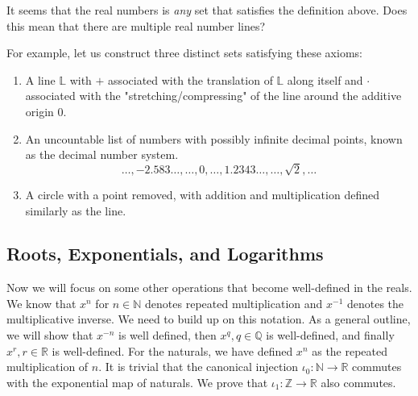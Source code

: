   It seems that the real numbers is \textit{any} set that satisfies the definition above. Does this mean that there are multiple real number lines? 

  \begin{example}
    For example, let us construct three distinct sets satisfying these axioms: 
    \begin{enumerate}
      \item A line $\mathbb{L}$ with $+$ associated with the translation of $\mathbb{L}$ along itself and $\cdot$ associated with the "stretching/compressing" of the line around the additive origin $0$. 
      \item An uncountable list of numbers with possibly infinite decimal points, known as the decimal number system. 
      \begin{equation}
        \ldots, -2.583\ldots, \ldots , 0, \ldots, 1.2343\ldots, \ldots, \sqrt{2}, \ldots
      \end{equation}
      \item A circle with a point removed, with addition and multiplication defined similarly as the line. 
    \end{enumerate}
  \end{example}

\subsection{Roots, Exponentials, and Logarithms} 

  Now we will focus on some other operations that become well-defined in the reals. We know that $x^{n}$ for $n \in \mathbb{N}$ denotes repeated multiplication and $x^{-1}$ denotes the multiplicative inverse. We need to build up on this notation. As a general outline, we will show that $x^{-n}$ is well defined, then $x^q, q \in \mathbb{Q}$ is well-defined, and finally $x^r, r \in \mathbb{R}$ is well-defined. For the naturals, we have defined $x^n$ as the repeated multiplication of $n$. It is trivial that the canonical injection $\iota_0: \mathbb{N} \rightarrow \mathbb{R}$ commutes with the exponential map of naturals. We prove that $\iota_1: \mathbb{Z} \rightarrow \mathbb{R}$ also commutes. 

